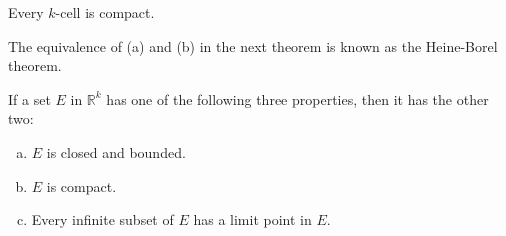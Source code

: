 \begin{thm}
    \label{thm:2.40}
    Every $k$-cell is compact.
\end{thm}


The equivalence of (a) and (b) in the next theorem is known as the Heine-Borel theorem.

\begin{thm}
    \label{thm:2.41}
    If a set $E$ in $\mathbb{R}^k$ has one of the following three properties, then it has the other two:
    \begin{enumerate}[(a)]
        \item $E$ is closed and bounded.
        \item $E$ is compact.
        \item Every infinite subset of $E$ has a limit point in $E$.
    \end{enumerate}
\end{thm}

